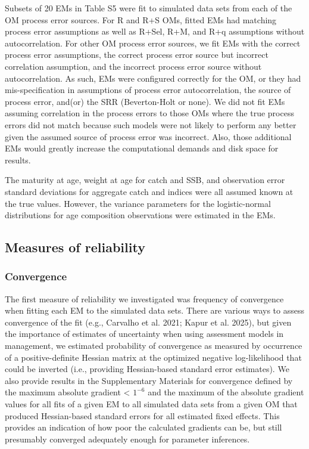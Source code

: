\documentclass[
  12pt,
]{article}
\begin{document}
Subsets of 20 EMs in Table S5 were fit to simulated data sets from each
of the OM process error sources. For R and R+S OMs, fitted EMs had
matching process error assumptions as well as R+Sel, R+M, and R+q
assumptions without autocorrelation. For other OM process error sources,
we fit EMs with the correct process error assumptions, the correct
process error source but incorrect correlation assumption, and the
incorrect process error source without autocorrelation. As such, EMs
were configured correctly for the OM, or they had mis-specification in
assumptions of process error autocorrelation, the source of process
error, and(or) the SRR (Beverton-Holt or none). We did not fit EMs
assuming correlation in the process errors to those OMs where the true
process errors did not match because such models were not likely to
perform any better given the assumed source of process error was
incorrect. Also, those additional EMs would greatly increase the
computational demands and disk space for results.

The maturity at age, weight at age for catch and SSB, and observation
error standard deviations for aggregate catch and indices were all
assumed known at the true values. However, the variance parameters for
the logistic-normal distributions for age composition observations were
estimated in the EMs.

\subsection*{Measures of reliability}\label{measures-of-reliability}

\subsubsection*{Convergence}\label{convergence}

The first measure of reliability we investigated was frequency of
convergence when fitting each EM to the simulated data sets. There are
various ways to assess convergence of the fit (e.g., Carvalho et al.
2021; Kapur et al. 2025), but given the importance of estimates of
uncertainty when using assessment models in management, we estimated
probability of convergence as measured by occurrence of a
positive-definite Hessian matrix at the optimized negative
log-likelihood that could be inverted (i.e., providing Hessian-based
standard error estimates). We also provide results in the Supplementary
Materials for convergence defined by the maximum absolute gradient
\textless{} \(1^{-6}\) and the maximum of the absolute gradient values
for all fits of a given EM to all simulated data sets from a given OM
that produced Hessian-based standard errors for all estimated fixed
effects. This provides an indication of how poor the calculated
gradients can be, but still presumably converged adequately enough for
parameter inferences.
\end{document}
